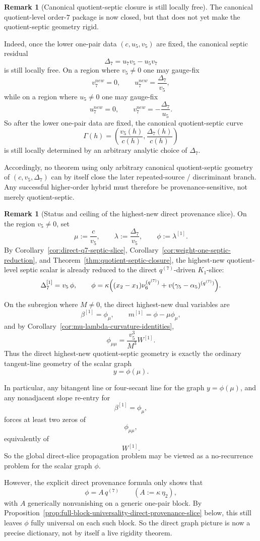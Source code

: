 \documentclass[11pt,a4paper]{amsart}
\def\new{new}%
\theoremstyle{plain}
\theoremstyle{definition}
\newtheorem{remark}[theorem]{Remark}
\newcommand{\new}{\mathrm{new}}
\begin{document}
\begin{remark}[Canonical quotient-septic closure is still locally free]
\label{rem:canonical-quotient-septic-closure-still-locally-free}
The canonical quotient-level order-$7$ package is now closed, but that does not
yet make the quotient-septic geometry rigid.

Indeed, once the lower one-pair data $(c,u_5,v_5)$ are fixed, the canonical
septic residual
\[
\Delta_7=u_7v_5-u_5v_7
\]
is still locally free. On a region where $v_5\neq 0$ one may gauge-fix
\[
v_7^{\new}=0,
\qquad
u_7^{\new}=\frac{\Delta_7}{v_5},
\]
while on a region where $u_5\neq 0$ one may gauge-fix
\[
u_7^{\new}=0,
\qquad
v_7^{\new}=-\frac{\Delta_7}{u_5}.
\]
So after the lower one-pair data are fixed, the canonical quotient-septic curve
\[
\Gamma(h)=\left(\frac{v_5(h)}{c(h)},\frac{\Delta_7(h)}{c(h)}\right)
\]
is still locally determined by an arbitrary analytic choice of $\Delta_7$.

Accordingly, no theorem using only arbitrary canonical quotient-septic geometry
of $(c,v_5,\Delta_7)$ can by itself close the later repeated-source /
discriminant branch. Any successful higher-order hybrid must therefore be
provenance-sensitive, not merely quotient-septic.
\end{remark}

\begin{remark}[Status and ceiling of the highest-new direct provenance slice]
\label{rem:wip-highest-new-scalar-direct-slice}
On the region $v_5\neq 0$, set
\[
\mu:=\frac{c}{v_5},
\qquad
\lambda:=\frac{\Delta_7}{v_5},
\qquad
\phi:=\lambda^{[1]}.
\]
By Corollary~\ref{cor:direct-q7-septic-slice},
Corollary~\ref{cor:weight-one-septic-reduction}, and
Theorem~\ref{thm:quotient-septic-closure}, the highest-new quotient-level
septic scalar is already reduced to the direct $q^{(7)}$-driven $K_1$-slice:
\[
\Delta_7^{[1]}=v_5\,\phi,
\qquad
\phi
=
\kappa\Bigl(
(x_2-x_1)\nu_6^{(q^{(7)})}
+
v(\gamma_5-\alpha_5)^{(q^{(7)})}
\Bigr).
\]

On the subregion where $M\neq 0$, the direct highest-new dual variables are
\[
\beta^{[1]}=\phi_\mu,
\qquad
m^{[1]}=\phi-\mu\phi_\mu,
\]
and by Corollary~\ref{cor:mu-lambda-curvature-identities},
\[
\phi_{\mu\mu}=\frac{v_5^3}{M^3}W^{[1]}.
\]
Thus the direct highest-new quotient-septic geometry is exactly the ordinary
tangent-line geometry of the scalar graph
\[
y=\phi(\mu).
\]

In particular, any bitangent line or four-secant line for the graph
$y=\phi(\mu)$, and any nonadjacent slope re-entry for
\[
\beta^{[1]}=\phi_\mu,
\]
forces at least two zeros of
\[
\phi_{\mu\mu},
\]
equivalently of
\[
W^{[1]}.
\]
So the global direct-slice propagation problem may be viewed as a no-recurrence
problem for the scalar graph $\phi$.

However, the explicit direct provenance formula only shows that
\[
\phi=A\,q^{(7)}
\qquad
(A:=\kappa\,\eta_2),
\]
with $A$ generically nonvanishing on a generic one-pair block. By
Proposition~\ref{prop:full-block-universality-direct-provenance-slice} below,
this still leaves $\phi$ fully universal on each such block. So the direct
graph picture is now a precise dictionary, not by itself a live rigidity
theorem.
\end{remark}
\end{document}
